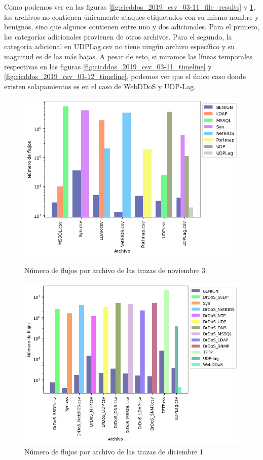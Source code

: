 Como podemos ver en las figuras \ref{fig:cicddos_2019_csv_03-11_file_results} y \ref{fig:cicddos_2019_csv_01-12_file_results}, los archivos no contienen únicamente ataques etiquetados con su mismo nombre y benignos, sino que algunos contienen entre uno y dos adicionales. Para el primero, las categorías adicionales provienen de otros archivos. Para el segundo, la categoría adicional en UDPLag.csv no tiene ningún archivo específico y su magnitud es de las más bajas. A pesar de esto, si miramos las líneas temporales respectivas en las figuras \ref{fig:cicddos_2019_csv_03-11_timeline} y \ref{fig:cicddos_2019_csv_01-12_timeline}, podemos ver que el único caso donde existen solapamientos es en el caso de WebDDoS y UDP-Lag.

\begin{figure}[!htb]
      \includegraphics[width=\linewidth]{media/cicddos_2019_csv_03-11_file_results.png}
      \captionsetup{justification=centering}
      \caption{Número de flujos por archivo de las trazas de noviembre 3}\label{fig:cicddos_2019_csv_03-11_file_results}
    \endminipage\hfill
      \includegraphics[width=\linewidth]{media/cicddos_2019_csv_01-12_file_results.png}
      \captionsetup{justification=centering}
      \caption{Número de flujos por archivo de las trazas de diciembre 1}\label{fig:cicddos_2019_csv_01-12_file_results}
    \endminipage\hfill
\end{figure}

